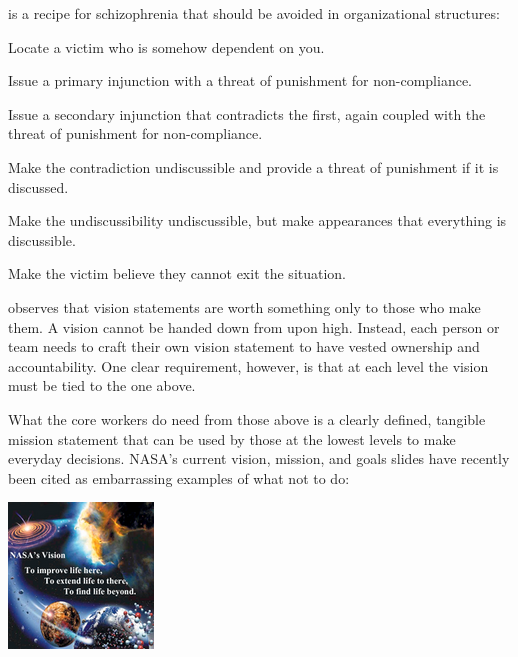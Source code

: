 \documentclass{tufte-handout}
\begin{document}
\cite{Bateson1956}\cite{Bateson1962}
is a recipe for schizophrenia that should be avoided in organizational
structures:
\begin{compactenum}
 \item Locate a victim who is somehow dependent on you.
 \item Issue a primary injunction with a threat of punishment for
       non-compliance.
 \item Issue a secondary injunction that contradicts the first, again
       coupled with the threat of punishment for non-compliance.
 \item Make the contradiction undiscussible and provide a threat of
       punishment if it is discussed.
 \item Make%
       the undiscussibility undiscussible, but make appearances
       that everything is discussible.
 \item Make the victim believe they cannot exit the situation.
\end{compactenum}

 observes that vision statements are worth something
only to those who make them.\cite{Block1993} 
A vision cannot be handed down from upon high.
Instead, each person or team needs to craft their own vision statement
to have vested ownership and accountability.
One clear requirement, however, is that at each level the vision must be
tied to the one above.

What%
the core workers do need from those above is a clearly defined,
tangible mission statement that can be used by those at the lowest levels
to make everyday decisions.
NASA's current vision, mission, and goals slides have recently been
cited\cite{Tufte2003}
as embarrassing examples of what not to do:
\vfill
\begin{center}
  \includegraphics[width=0.5\linewidth]{nasa_vision_sm}
\end{center}
\vfill
\newpage
\end{document}
